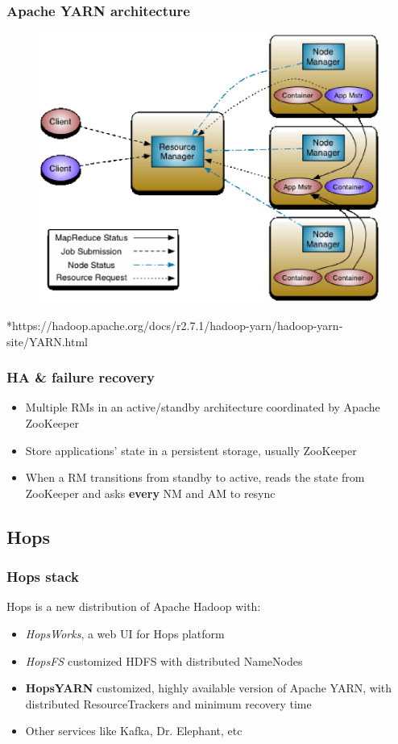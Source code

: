 \documentclass{beamer}
\begin{document}
\begin{frame}
\frametitle{Apache YARN architecture}
\begin{figure}
\centering
\includegraphics[scale=0.4]{resources/yarn_architecture.eps}
\end{figure}
\tiny{*https://hadoop.apache.org/docs/r2.7.1/hadoop-yarn/hadoop-yarn-site/YARN.html}
\end{frame}

\begin{frame}
\frametitle{HA \& failure recovery}
\begin{itemize}
\item Multiple RMs in an active/standby architecture coordinated by
  Apache ZooKeeper

\item Store applications' state in a persistent storage, usually
  ZooKeeper

\item When a RM transitions from standby to active, reads the state
  from ZooKeeper and asks \textbf{every} NM and AM to resync
\end{itemize}
\end{frame}

\subsection{Hops}
\begin{frame}
\frametitle{Hops stack}
Hops is a new distribution of Apache Hadoop with:
\begin{itemize}
\item \emph{HopsWorks}, a web UI for Hops platform
\item \emph{HopsFS} customized HDFS with distributed NameNodes
\item \textbf{HopsYARN} customized, highly available version of Apache
  YARN, with distributed ResourceTrackers and minimum recovery time
\item Other services like Kafka, Dr. Elephant, etc
\end{itemize}
\end{frame}
\end{document}
